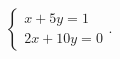$\displaystyle
\left\{
\begin{array}{l}
\displaystyle x + 5y = 1 \\
\displaystyle 2x + 10y = 0
\end{array}
\right.
$. %
